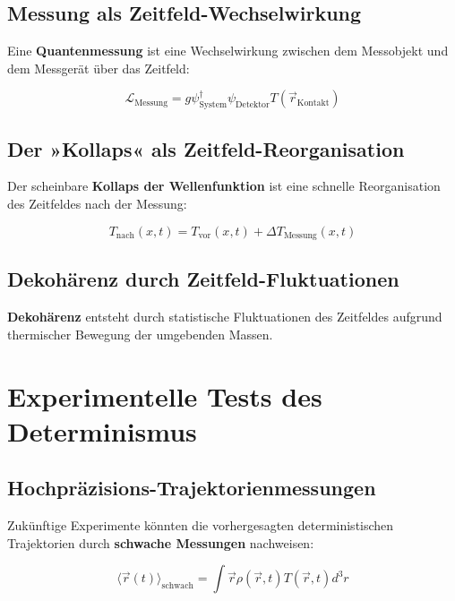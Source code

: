 \documentclass[12pt,a4paper]{report}
\begin{document}
	\subsection{Messung als Zeitfeld-Wechselwirkung}
	
	Eine \textbf{Quantenmessung} ist eine Wechselwirkung zwischen dem Messobjekt und dem Messgerät über das Zeitfeld:
	
	\begin{equation}
		\mathcal{L}_{\text{Messung}} = g \psi_{\text{System}}^\dagger \psi_{\text{Detektor}} T(\vec{r}_{\text{Kontakt}})
	\end{equation}
	
	\subsection{Der »Kollaps« als Zeitfeld-Reorganisation}
	
	Der scheinbare \textbf{Kollaps der Wellenfunktion} ist eine schnelle Reorganisation des Zeitfeldes nach der Messung:
	
	\begin{equation}
		T_{\text{nach}}(x,t) = T_{\text{vor}}(x,t) + \Delta T_{\text{Messung}}(x,t)
	\end{equation}
	
	\subsection{Dekohärenz durch Zeitfeld-Fluktuationen}
	
	\textbf{Dekohärenz} entsteht durch statistische Fluktuationen des Zeitfeldes aufgrund thermischer Bewegung der umgebenden Massen.
	
	\section{Experimentelle Tests des Determinismus}
	
	\subsection{Hochpräzisions-Trajektorienmessungen}
	
	Zukünftige Experimente könnten die vorhergesagten deterministischen Trajektorien durch \textbf{schwache Messungen} nachweisen:
	
	\begin{equation}
		\langle\vec{r}(t)\rangle_{\text{schwach}} = \int \vec{r} \rho(\vec{r},t) T(\vec{r},t) d^3r
	\end{equation}
	
\end{document}
